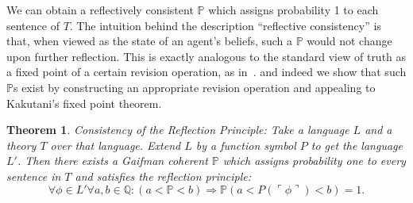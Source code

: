 \documentclass[12pt]{article}
\newcommand{\PP}{\mathbb{P}}
\theoremstyle{plain}
\newtheorem{theorem}{Theorem}[subsection]
\theoremstyle{definition}
\theoremstyle{remark}
\begin{document}
We can obtain a reflectively consistent $\PP$ which assigns probability 1 to each sentence of $T$.
The intuition behind the description ``reflective consistency''
is that, when viewed as the state of an agent's beliefs, such a $\PP$ would not change upon further reflection.
This is exactly analogous to the standard view of truth
as a fixed point of a certain revision operation, as in~\cite{kripke75}.
and indeed we show that such $\PP$s exist
by constructing an appropriate revision operation and appealing
to Kakutani's fixed point theorem.
\begin{theorem} \emph{Consistency of the Reflection Principle}: 
Take a language $L$ and a theory $T$ over that language. Extend $L$ by a function symbol $P$ to get the language $L'$. Then there exists a Gaifman coherent $\mathbb{P}$ which assigns probability one to every sentence in $T$ and satisfies the reflection principle:
$$\forall \phi\in L'\forall a,b\in \mathbb{Q}: (a<\mathbb{P}<b)\Rightarrow \mathbb{P}(a<P(\ulcorner \phi\urcorner)<b)=1.$$
\end{theorem}
\end{document}
